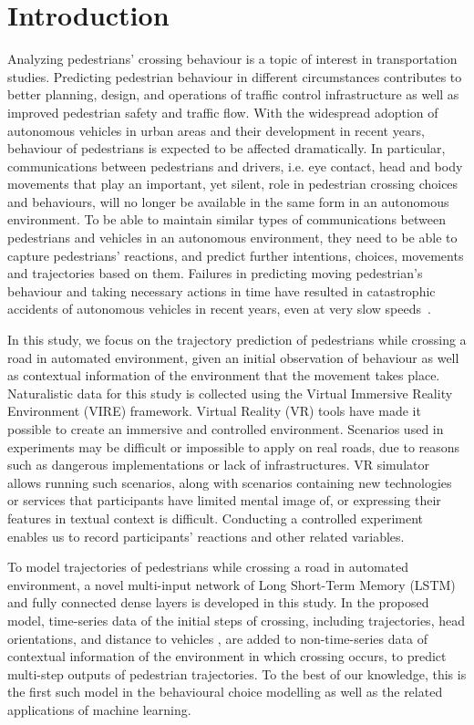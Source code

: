 \section{Introduction}
\label{S:TInt}

Analyzing pedestrians' crossing behaviour is a topic of interest in transportation studies. Predicting pedestrian behaviour in different circumstances contributes to better planning, design, and operations of traffic control infrastructure as well as improved pedestrian safety and traffic flow. With the widespread adoption of autonomous vehicles in urban areas and their development in recent years, behaviour of pedestrians is expected to be affected dramatically. In particular, communications between pedestrians and drivers, i.e. eye contact, head and body movements that play an important, yet silent, role in pedestrian crossing choices and behaviours, will no longer be available in the same form in an autonomous environment. To be able to maintain similar types of communications between pedestrians and vehicles in an autonomous environment, they need to be able to capture pedestrians' reactions, and predict further intentions, choices, movements and trajectories based on them. Failures in predicting moving pedestrian's behaviour and taking necessary actions in time have resulted in catastrophic accidents of autonomous vehicles in recent years, even at very slow speeds~\citep{uber,vienna}.

In this study, we focus on the trajectory prediction of pedestrians while crossing a road in automated environment, given an initial observation of behaviour as well as contextual information of the environment that the movement takes place. Naturalistic data for this study is collected using the Virtual Immersive Reality Environment (VIRE) \citep{farooqvire} framework. Virtual Reality (VR) tools have made it possible to create an immersive and controlled environment. Scenarios used in experiments may be difficult or impossible to apply on real roads, due to reasons such as dangerous implementations or lack of infrastructures. VR simulator allows running such scenarios, along with scenarios containing new technologies or services that participants have limited mental image of, or expressing their features in textual context is difficult. Conducting a controlled experiment enables us to record participants' reactions and other related variables.

To model trajectories of pedestrians while crossing a road in automated environment, a novel multi-input network of Long Short-Term Memory (LSTM) and fully connected dense layers is developed in this study. In the proposed model, time-series data of the initial steps of crossing, including trajectories, head orientations, and distance to vehicles , are added to non-time-series data of contextual information of the environment in which crossing occurs, to predict multi-step outputs of pedestrian trajectories. To the best of our knowledge, this is the first such model in the behavioural choice modelling as well as the related applications of machine learning.

